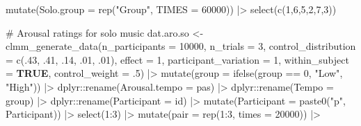 \documentclass[
  bookmarksnumbered]{article}
\newenvironment{Shaded}{\begin{snugshade}}{\end{snugshade}}
\newcommand{\AttributeTok}[1]{\textcolor[rgb]{0.80,0.80,0.80}{#1}}
\newcommand{\CommentTok}[1]{\textcolor[rgb]{0.50,0.62,0.50}{#1}}
\newcommand{\ConstantTok}[1]{\textcolor[rgb]{0.86,0.64,0.64}{\textbf{#1}}}
\newcommand{\DecValTok}[1]{\textcolor[rgb]{0.86,0.86,0.80}{#1}}
\newcommand{\FunctionTok}[1]{\textcolor[rgb]{0.94,0.94,0.56}{#1}}
\newcommand{\NormalTok}[1]{\textcolor[rgb]{0.80,0.80,0.80}{#1}}
\newcommand{\OtherTok}[1]{\textcolor[rgb]{0.94,0.94,0.56}{#1}}
\newcommand{\SpecialCharTok}[1]{\textcolor[rgb]{0.86,0.64,0.64}{#1}}
\newcommand{\StringTok}[1]{\textcolor[rgb]{0.80,0.58,0.58}{#1}}
\begin{document}
\begin{Shaded}
\begin{Highlighting}[]
  \FunctionTok{mutate}\NormalTok{(}\AttributeTok{Solo.group =} \FunctionTok{rep}\NormalTok{(}\StringTok{"Group"}\NormalTok{, }\AttributeTok{TIMES =} \DecValTok{60000}\NormalTok{)) }\SpecialCharTok{|\textgreater{}}
  \FunctionTok{select}\NormalTok{(}\FunctionTok{c}\NormalTok{(}\DecValTok{1}\NormalTok{,}\DecValTok{6}\NormalTok{,}\DecValTok{5}\NormalTok{,}\DecValTok{2}\NormalTok{,}\DecValTok{7}\NormalTok{,}\DecValTok{3}\NormalTok{))}

\CommentTok{\# Arousal ratings for solo music}
\NormalTok{dat.aro.so }\OtherTok{\textless{}{-}} \FunctionTok{clmm\_generate\_data}\NormalTok{(}\AttributeTok{n\_participants =} \DecValTok{10000}\NormalTok{,}
                                 \AttributeTok{n\_trials =} \DecValTok{3}\NormalTok{,}
                                 \AttributeTok{control\_distribution =} \FunctionTok{c}\NormalTok{(.}\DecValTok{43}\NormalTok{, .}\DecValTok{41}\NormalTok{, .}\DecValTok{14}\NormalTok{, .}\DecValTok{01}\NormalTok{, .}\DecValTok{01}\NormalTok{),}
                                 \AttributeTok{effect =} \DecValTok{1}\NormalTok{,}
                                 \AttributeTok{participant\_variation =} \DecValTok{1}\NormalTok{,}
                                 \AttributeTok{within\_subject =} \ConstantTok{TRUE}\NormalTok{,}
                                 \AttributeTok{control\_weight =}\NormalTok{ .}\DecValTok{5}\NormalTok{) }\SpecialCharTok{|\textgreater{}}
  \FunctionTok{mutate}\NormalTok{(}\AttributeTok{group =} \FunctionTok{ifelse}\NormalTok{(group }\SpecialCharTok{==} \DecValTok{0}\NormalTok{, }\StringTok{"Low"}\NormalTok{, }\StringTok{"High"}\NormalTok{)) }\SpecialCharTok{|\textgreater{}}
\NormalTok{  dplyr}\SpecialCharTok{::}\FunctionTok{rename}\NormalTok{(}\AttributeTok{Arousal.tempo =}\NormalTok{ pas) }\SpecialCharTok{|\textgreater{}}
\NormalTok{  dplyr}\SpecialCharTok{::}\FunctionTok{rename}\NormalTok{(}\AttributeTok{Tempo =}\NormalTok{ group) }\SpecialCharTok{|\textgreater{}}
\NormalTok{  dplyr}\SpecialCharTok{::}\FunctionTok{rename}\NormalTok{(}\AttributeTok{Participant =}\NormalTok{ id) }\SpecialCharTok{|\textgreater{}}
  \FunctionTok{mutate}\NormalTok{(}\AttributeTok{Participant =} \FunctionTok{paste0}\NormalTok{(}\StringTok{"p"}\NormalTok{, Participant)) }\SpecialCharTok{|\textgreater{}}
  \FunctionTok{select}\NormalTok{(}\DecValTok{1}\SpecialCharTok{:}\DecValTok{3}\NormalTok{) }\SpecialCharTok{|\textgreater{}}
  \FunctionTok{mutate}\NormalTok{(}\AttributeTok{pair =} \FunctionTok{rep}\NormalTok{(}\DecValTok{1}\SpecialCharTok{:}\DecValTok{3}\NormalTok{, }\AttributeTok{times =} \DecValTok{20000}\NormalTok{)) }\SpecialCharTok{|\textgreater{}}

\end{Highlighting}
\end{Shaded}
\end{document}
